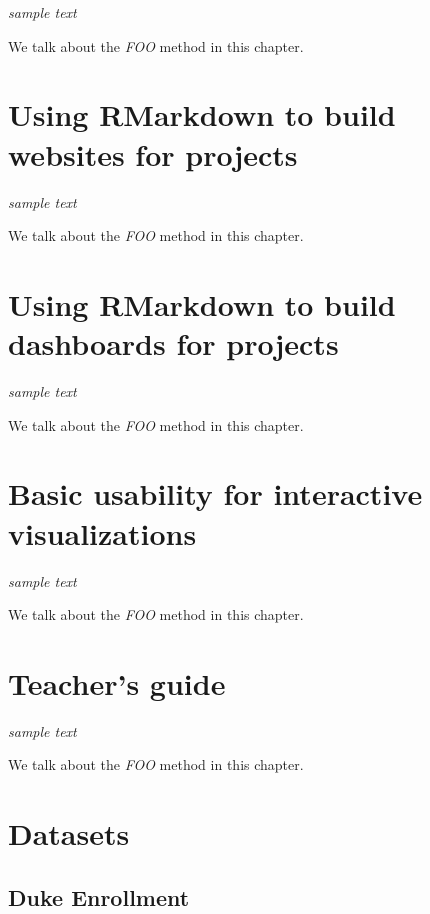 \documentclass[
]{krantz}
\begin{document}
\emph{sample text}

We talk about the \emph{FOO} method in this chapter.

\hypertarget{rmarkdown-websites}{%
\chapter{Using RMarkdown to build websites for projects}\label{rmarkdown-websites}}

\emph{sample text}

We talk about the \emph{FOO} method in this chapter.

\hypertarget{rmarkdown-dashboards}{%
\chapter{Using RMarkdown to build dashboards for projects}\label{rmarkdown-dashboards}}

\emph{sample text}

We talk about the \emph{FOO} method in this chapter.

\hypertarget{usability-for-visualizations}{%
\chapter{Basic usability for interactive visualizations}\label{usability-for-visualizations}}

\emph{sample text}

We talk about the \emph{FOO} method in this chapter.

\hypertarget{teachers-guide}{%
\chapter{Teacher's guide}\label{teachers-guide}}

\emph{sample text}

We talk about the \emph{FOO} method in this chapter.

\cleardoublepage

\hypertarget{appendix-appendix}{%
\appendix {}}


\hypertarget{datasets}{%
\chapter{Datasets}\label{datasets}}

\hypertarget{duke-enrollment}{%
\section*{Duke Enrollment}\label{duke-enrollment}}
\end{document}
